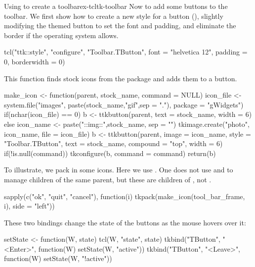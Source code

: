 \begin{example}{Using  to create a toolbar}{ex-tcltk-toolbar}
Now to add some buttons to the toolbar. We first show how to create a
new style for a button (), slightly modifying the themed button to set
the font and padding, and eliminate the border if the operating system allows. 
\begin{Schunk}
\begin{Sinput}
 tcl("ttk::style", "configure", "Toolbar.TButton", 
     font = "helvetica 12", padding = 0, borderwidth = 0)
\end{Sinput}
\end{Schunk}
%
This  function finds stock icons from the
 package and adds them to a button.
\begin{Schunk}
\begin{Sinput}
 make_icon <- function(parent, stock_name, command = NULL) {
   icon_file <- system.file("images", 
                           paste(stock_name,"gif",sep = "."), 
                           package = "gWidgets")
   if(nchar(icon_file) == 0) {
     b <- ttkbutton(parent, text = stock_name, width = 6)
   } else {
     icon_name <- paste("::img::",stock_name, sep = "")
     tkimage.create("photo", icon_name, file = icon_file)
     b <- ttkbutton(parent, image = icon_name, 
                    style = "Toolbar.TButton", text = stock_name, 
                    compound = "top", width = 6)
     if(!is.null(command))
       tkconfigure(b, command = command)
   }
   return(b)
 }
\end{Sinput}
\end{Schunk}
%
To illustrate, we pack in some icons. Here we use .  
One does not use  and  to manage
children of the same parent, but these are children of ,
not .
\begin{Schunk}
\begin{Sinput}
 sapply(c("ok", "quit", "cancel"), function(i)
        tkpack(make_icon(tool_bar_frame, i), side = "left"))
\end{Sinput}
\end{Schunk}

These two bindings change the state of the buttons as the mouse hovers
over it:

\begin{Schunk}
\begin{Sinput}
 setState <- function(W, state) tcl(W, "state", state)
 tkbind("TButton", "<Enter>", function(W) setState(W, "active"))
 tkbind("TButton", "<Leave>", function(W) setState(W, "!active"))
\end{Sinput}
\end{Schunk}


\end{example}
